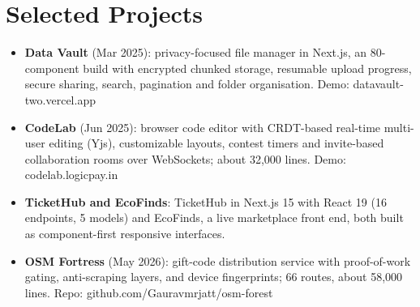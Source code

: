 \documentclass[11pt,a4paper,sans]{moderncv}
\begin{document}


\section{Selected Projects}
\vspace{1pt}
\begin{itemize}
    \item {\textbf{Data Vault} (Mar 2025): privacy-focused file manager in Next.js, an 80-component build with encrypted chunked storage, resumable upload progress, secure sharing, search, pagination and folder organisation. Demo: datavault-two.vercel.app}
    \item {\textbf{CodeLab} (Jun 2025): browser code editor with CRDT-based real-time multi-user editing (Yjs), customizable layouts, contest timers and invite-based collaboration rooms over WebSockets; about 32,000 lines. Demo: codelab.logicpay.in}
    \item {\textbf{TicketHub and EcoFinds}: TicketHub in Next.js 15 with React 19 (16 endpoints, 5 models) and EcoFinds, a live marketplace front end, both built as component-first responsive interfaces.}
    \item {\textbf{OSM Fortress} (May 2026): gift-code distribution service with proof-of-work gating, anti-scraping layers, and device fingerprints; 66 routes, about 58,000 lines. Repo: github.com/Gauravmrjatt/osm-forest}
\end{itemize}
\end{document}
